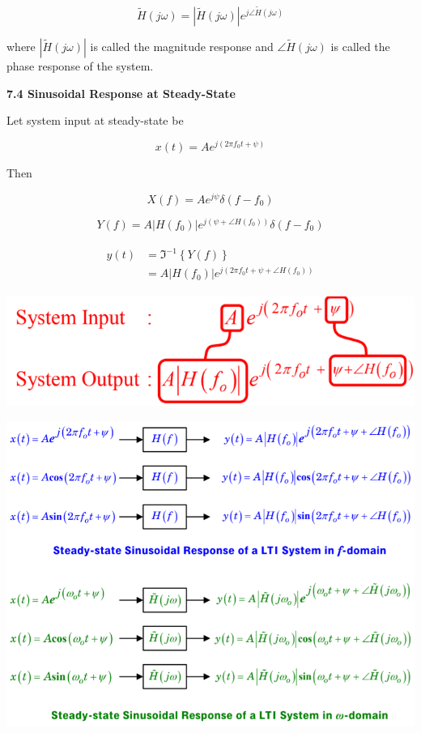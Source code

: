 \documentclass[landscape,a4paper]{extarticle}
\newenvironment{Figure}
  {\par\medskip\noindent\minipage{\linewidth}}
  {\endminipage\par\medskip}
\newcommand{\invfourier}[1]{\Im^{-1}\left\{#1\right\}}
\begin{document}
\begin{multicols*}{5}
    \[
        \tilde{H}(j\omega) = |\tilde{H}(j\omega)|e^{j\angle \tilde{H}(j \omega)} \tag{7.14}
    \]

    where $|\tilde{H}(j \omega)|$ is called the magnitude response
    and $\angle \tilde{H}(j \omega)$ is called the phase response of the system.

    \textbf{7.4 Sinusoidal Response at Steady-State}

    Let system input at steady-state be 
    
    \[
        x(t) = Ae^{j (2\pi f_0t + \psi)} \tag{7.15}
    \]

    Then

    \[
        X(f) = Ae^{j\psi}\delta (f-f_0) \tag{7.16}
    \]

    \[
        Y(f) = A \left|H(f_0)\right|e^{j(\psi + \angle H(f_0))}\delta(f-f_0) \tag{7.17}
    \]

    \begin{align*}
        \begin{split}
            y(t) &= \invfourier{Y(f)}\\
            &= A \left|H(f_0)\right|e^{j(2\pi f_0 t + \psi + \angle H(f_0))} 
        \end{split} \tag{7.18}
    \end{align*}

    \begin{Figure}
        \includegraphics[width=0.8\linewidth]{sinusoidalResponseComparison.png}        
    \end{Figure}

    \begin{Figure}
        \includegraphics[width=\linewidth]{sinusoidalResponse.png}        
    \end{Figure}


\end{multicols*}
\end{document}
